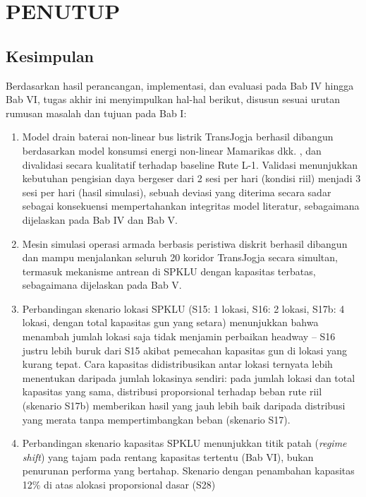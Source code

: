 \cleardoublepage
\chapter{PENUTUP}
\label{chap:penutup}

\section{Kesimpulan}

Berdasarkan hasil perancangan, implementasi, dan evaluasi pada Bab IV
hingga Bab VI, tugas akhir ini menyimpulkan hal-hal berikut, disusun
sesuai urutan rumusan masalah dan tujuan pada Bab I:

\begin{enumerate}
	\item Model drain baterai non-linear bus listrik TransJogja berhasil
	dibangun berdasarkan model konsumsi energi non-linear Mamarikas dkk. \autocite{mamarikas2025}, dan
	divalidasi secara kualitatif terhadap baseline Rute L-1. Validasi
	menunjukkan kebutuhan pengisian daya bergeser dari 2 sesi per hari
	(kondisi riil) menjadi 3 sesi per hari (hasil simulasi), sebuah
	deviasi yang diterima secara sadar sebagai konsekuensi mempertahankan
	integritas model literatur, sebagaimana dijelaskan pada Bab IV dan
	Bab V.
	\item Mesin simulasi operasi armada berbasis peristiwa diskrit berhasil
	dibangun dan mampu menjalankan seluruh 20 koridor TransJogja secara
	simultan, termasuk mekanisme antrean di SPKLU dengan kapasitas
	terbatas, sebagaimana dijelaskan pada Bab V.
	\item Perbandingan skenario lokasi SPKLU (S15: 1 lokasi, S16: 2 lokasi,
	S17b: 4 lokasi, dengan total kapasitas gun yang setara) menunjukkan
	bahwa menambah jumlah lokasi saja tidak menjamin perbaikan headway --
	S16 justru lebih buruk dari S15 akibat pemecahan kapasitas gun di
	lokasi yang kurang tepat. Cara kapasitas didistribusikan antar lokasi
	ternyata lebih menentukan daripada jumlah lokasinya sendiri: pada
	jumlah lokasi dan total kapasitas yang sama, distribusi proporsional
	terhadap beban rute riil (skenario S17b) memberikan hasil yang jauh
	lebih baik daripada distribusi yang merata tanpa mempertimbangkan
	beban (skenario S17).
	\item Perbandingan skenario kapasitas SPKLU menunjukkan titik patah
	(\textit{regime shift}) yang tajam pada rentang kapasitas tertentu
	(Bab VI), bukan penurunan performa yang bertahap. Skenario dengan
	penambahan kapasitas 12\% di atas alokasi proporsional dasar (S28)

\end{enumerate}

